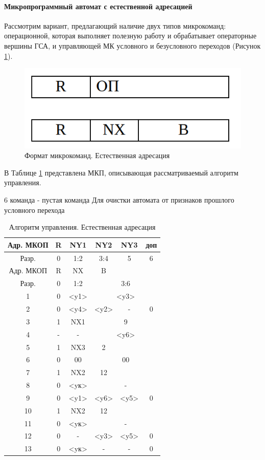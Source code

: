 \documentclass[a4paper,14pt]{extarticle}
\begin{document}
\newpage
\paragraph{Микропрограммный автомат с естественной адресацией}
Рассмотрим вариант, предлагающий наличие двух типов микрокоманд: операционной, которая выполняет полезную работу и обрабатывает операторные
вершины ГСА, и управляющей МК условного и безусловного переходов (Рисунок \ref{fig:mk-mix-nat}).

\begin{figure}[h!]
	\centering
	\includegraphics[width=0.4\linewidth]{images/mk-mix-nat}
	\caption{Формат микрокоманд. Естественная адресация}
	\label{fig:mk-mix-nat}
\end{figure}


В Таблице \ref{tab:manage-algorithm2} представлена МКП, описывающая рассматриваемый алгоритм управления. 

6 команда  - пустая команда
Для очистки автомата от признаков прошлого условного перехода


\begin{table}[h!]
	\centering
	\begin{tabular}{|c|c|c|c|c|c|}
		\hline
		Адр. МКОП & R & NY1 & NY2 & NY3 & доп \\ \hline
		Разр. & 0 & 1:2 & 3:4 & 5 & 6 \\ \hline
		Адр. МКОП & R & NX & B &  &  \\ \hline
		Разр. & 0 & 1:2 & \multicolumn{ 3}{c|}{3:6} \\ \hline\hline
		1 & 0 & <y1> & \multicolumn{ 3}{c|}{<y3>} \\ \hline
		2 & 0 & <y4> & <y2> & - & 0 \\ \hline
		3 & 1 & NX1 & \multicolumn{ 3}{c|}{9}  \\ \hline
		4 & - & - & \multicolumn{ 3}{c|}{<y6>} \\ \hline
		5 & 1 & NX3 & 2 &  &  \\ \hline
		6 & 0 & 00 & \multicolumn{ 3}{c|}{00} \\ \hline
		7 & 1 & NX2 & 12 &  &  \\ \hline
		8 & 0 & <yк> & \multicolumn{ 3}{c|}{-} \\ \hline
		9 & 0 & <y1> & <y6> & <y5> & 0 \\ \hline
		10 & 1 & NX2 & 12 &  &  \\ \hline
		11 & 0 & <yк> & \multicolumn{ 3}{c|}{-} \\ \hline
		12 & 0 & - & <y3> & <y5> & 0 \\ \hline
		13 & 0 & <yк> & - & - & 0 \\ \hline
	\end{tabular}
	\caption{Алгоритм управления. Естественная адресация }
	\label{tab:manage-algorithm2}
\end{table}
\end{document}
